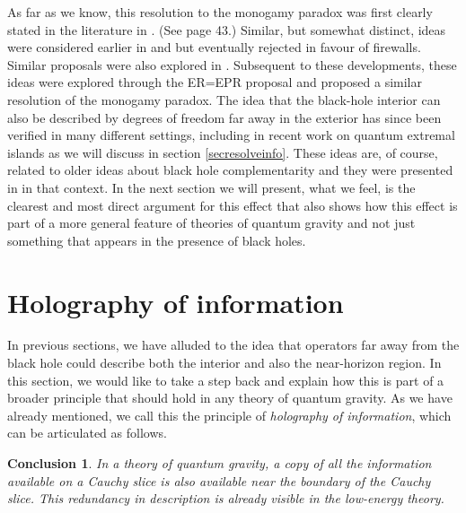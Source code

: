 \documentclass[12pt]{article}
\newtheorem{lesson}{Conclusion}
\begin{document}
As far as we know, this resolution to the monogamy paradox was first clearly stated in the literature in \cite{Papadodimas:2012aq}. (See page 43.) Similar, but somewhat distinct, ideas were considered earlier in \cite{Bousso:2012as} and \cite{Susskind:2012uw} but eventually rejected in favour of firewalls. Similar proposals were also explored in  \cite{Nomura:2013gna,Nomura:2012sw,Verlinde:2012cy}. Subsequent to these developments, these ideas were explored through the ER=EPR proposal and  \cite{Maldacena:2013xja} proposed a similar resolution of the monogamy paradox.  The idea that the black-hole interior can also be described by degrees of freedom far away in the exterior has since been verified in many different settings, including in recent work on quantum extremal islands as we will discuss in section \ref{secresolveinfo}.  These ideas are, of course, related to older ideas about black hole complementarity \cite{'tHooft:1984re,Susskind:1993mu,Susskind:1993if} and they were presented in \cite{Papadodimas:2012aq} in that context. In the next section we will present, what we feel, is the clearest and most direct argument for this effect that also shows how this effect is part of a more general feature of theories of quantum gravity and not just something that appears in the presence of black holes.







\section{Holography of information \label{secholography}}
In previous sections, we have alluded to the idea that operators far
away from the black hole could describe both the interior and also the near-horizon region.
In this section,  we would like to take a step back and explain
how this is part of a broader principle that should hold in any
theory of quantum gravity. As we have  already mentioned, we call this the principle of {\em holography of information}, which can be articulated as follows.
\begin{lesson}
\label{lessonholography}
In a theory of quantum gravity, a copy of all the information available on a Cauchy slice is also available near the boundary of the Cauchy slice. This redundancy in description is already visible in the low-energy theory.
\end{lesson}
\end{document}

